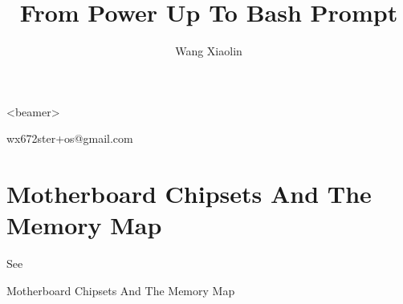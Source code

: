 \begin{frame}<beamer>
    \title{From Power Up To Bash Prompt}
    \author{Wang Xiaolin}
    \titlepage
    \vfill
    \tiny{
       wx672ster+os@gmail.com
    }
\end{frame}

\section{Motherboard Chipsets And The Memory Map}
\label{sec:moth-chips-memory}

See \cite{gustavo2008chipsets}

\begin{frame}{Motherboard Chipsets And The Memory Map}
  \begin{center}
  \end{center}
\end{frame}

